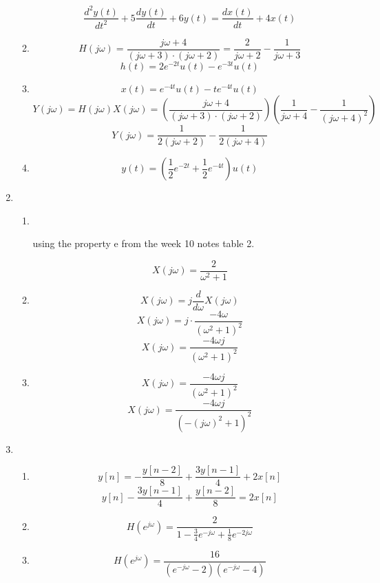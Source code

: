 \documentclass[10pt,a4paper, margin=1in]{article}
\begin{document}
\begin{enumerate}
\begin{enumerate}
    \[ \frac{d^2y(t)}{dt^2} + 5 \frac{dy(t)}{dt} + 6y(t) = \frac{dx(t)}{dt} + 4 x(t)\]
    \item %
    \[H(j\omega) = \frac{j\omega + 4}{(j\omega + 3) \cdot (j\omega + 2)} = \frac{2}{j\omega+2} - \frac{1}{j\omega+3}\]
    \[h(t) = 2 e^{-2t} u(t) - e^{-3t} u(t) \]
    \item %
    \[x(t) = e^{-4t} u(t) - te^{-4t} u(t)\]
    \[ Y(j\omega) = H(j\omega)X(j\omega) = (\frac{j\omega + 4}{(j\omega + 3) \cdot (j\omega + 2)})(\frac{1}{j\omega + 4} - \frac{1}{(j\omega + 4)^2})\]
    \[ Y(j\omega) = \frac{1}{2 (j\omega + 2)} - \frac{1}{2 (j\omega + 4)}\]
    
    \item %
    \[ y(t) = (\frac{1}{2} e^{-2t} + \frac{1}{2} e^{-4t}) u(t)\]
    \end{enumerate}

\item %
    \begin{enumerate}
    \item %
    ~ \\
    \begin{center}
        using the property e from the week 10 notes table 2.
    \end{center}
    
    \[ X(j\omega) = \frac{2}{\omega^2 + 1}\]
    
    \item %
    
    \[ X(j\omega) = j \frac{d}{d\omega} X(j\omega) \]
    \[ X(j\omega) = j \cdot \frac{-4\omega}{(\omega^2 + 1)^2} \]
    \[ X(j\omega) = \frac{-4\omega j}{(\omega^2 + 1)^2} \]
    
    \item %
    
    \[ X(j\omega) = \frac{-4\omega j}{(\omega^2 + 1)^2} \]
    \[ X(j\omega) = \frac{-4\omega j}{(-(j\omega)^2 + 1)^2} \]
    
    \end{enumerate}

\item %
    \begin{enumerate}
    \item %
    \[ y[n] = -\frac{y[n-2]}{8} + \frac{3y[n-1]}{4} + 2x[n]\]
    \[ y[n] - \frac{3y[n-1]}{4} + \frac{y[n-2]}{8} = 2x[n]\]
    \item %
    \[H(e^{j\omega}) = \frac{2}{1 - \frac{3}{4} e^{-j\omega}+ \frac{1}{8} e^{-2j\omega} }\]
    \item %
    \[H(e^{j\omega}) = \frac{16}{(e^{-j\omega} -2) (e^{-j\omega} -4) }\]
    

\end{enumerate}
\end{enumerate}
\end{document}
